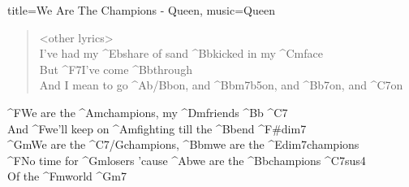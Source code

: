 \begin{song}[align-chords=l]{title={We Are The Champions - Queen}, music={Queen}}
	\begin{verse}
		<other lyrics> \\
		I've had my ^{Eb}share of sand ^{Bb}kicked in my ^{Cm}face \\
		But ^{F7}I've come ^{Bb}through \\
		And I mean to go ^{Ab/Bb}on, and ^{Bbm7b5}on, and ^{Bb7}on, and ^{C7}on \\
	\end{verse}
	
	\begin{chorus}
		^{F}We are the ^{Am}champions, my ^{Dm}friends ^{Bb} ^{C7} \\
		And ^{F}we'll keep on ^{Am}fighting till the ^{Bb}end ^{F#dim7} \\
		^{Gm}We are the ^{C7/G}champions, ^{Bbm}we are the ^{Edim7}champions \\
		^{F}No time for ^{Gm}losers 'cause ^{Ab}we are the ^{Bb}champions ^{C7sus4} \\
		Of the ^{Fm}world ^{Gm7}
 	\end{chorus}
\end{song}

